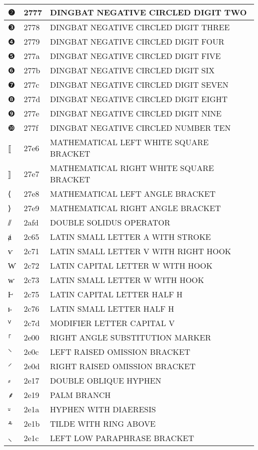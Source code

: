 \documentclass[12pt,letterpaper,openany]{book}
\begin{document}
\begin{center}
\begin{supertabular}{|m{0.25in}|m{0.5in}|m{4in}|}
❷ & 2777 & DINGBAT NEGATIVE CIRCLED DIGIT TWO\\\hline
❸ & 2778 & DINGBAT NEGATIVE CIRCLED DIGIT THREE\\\hline
❹ & 2779 & DINGBAT NEGATIVE CIRCLED DIGIT FOUR\\\hline
❺ & 277a & DINGBAT NEGATIVE CIRCLED DIGIT FIVE\\\hline
❻ & 277b & DINGBAT NEGATIVE CIRCLED DIGIT SIX\\\hline
❼ & 277c & DINGBAT NEGATIVE CIRCLED DIGIT SEVEN\\\hline
❽ & 277d & DINGBAT NEGATIVE CIRCLED DIGIT EIGHT\\\hline
❾ & 277e & DINGBAT NEGATIVE CIRCLED DIGIT NINE\\\hline
❿ & 277f & DINGBAT NEGATIVE CIRCLED NUMBER TEN\\\hline
⟦ & 27e6 & MATHEMATICAL LEFT WHITE SQUARE BRACKET\\\hline
⟧ & 27e7 & MATHEMATICAL RIGHT WHITE SQUARE BRACKET\\\hline
⟨ & 27e8 & MATHEMATICAL LEFT ANGLE BRACKET\\\hline
⟩ & 27e9 & MATHEMATICAL RIGHT ANGLE BRACKET\\\hline
⫽ & 2afd & DOUBLE SOLIDUS OPERATOR\\\hline
ⱥ & 2c65 & LATIN SMALL LETTER A WITH STROKE\\\hline
ⱱ & 2c71 & LATIN SMALL LETTER V WITH RIGHT HOOK\\\hline
Ⱳ & 2c72 & LATIN CAPITAL LETTER W WITH HOOK\\\hline
ⱳ & 2c73 & LATIN SMALL LETTER W WITH HOOK\\\hline
Ⱶ & 2c75 & LATIN CAPITAL LETTER HALF H\\\hline
ⱶ & 2c76 & LATIN SMALL LETTER HALF H\\\hline
ⱽ & 2c7d & MODIFIER LETTER CAPITAL V\\\hline
⸀ & 2e00 & RIGHT ANGLE SUBSTITUTION MARKER\\\hline
⸌ & 2e0c & LEFT RAISED OMISSION BRACKET\\\hline
⸍ & 2e0d & RIGHT RAISED OMISSION BRACKET\\\hline
⸗ & 2e17 & DOUBLE OBLIQUE HYPHEN\\\hline
⸙ & 2e19 & PALM BRANCH\\\hline
⸚ & 2e1a & HYPHEN WITH DIAERESIS\\\hline
⸛ & 2e1b & TILDE WITH RING ABOVE\\\hline
⸜ & 2e1c & LEFT LOW PARAPHRASE BRACKET\\\hline

\end{supertabular}
\end{center}
\end{document}
